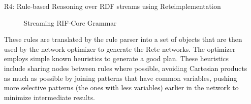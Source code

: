 \begin{nestedsection}{R4: Rule-based Reasoning over RDF streams using Rete}{implementation}
	\begin{figure}[t]
		\centering
		\begin{ebnf}
		\end{ebnf}
		\caption{Streaming RIF-Core Grammar}
	\end{figure}

	These rules are translated by the rule parser into a set of objects that are then used by the network optimizer to generate the Rete networks.
	The optimizer employs simple known heuristics to generate a good plan.
	These heuristics include sharing nodes between rules where possible, avoiding Cartesian products as much as possible by joining patterns that have common variables, pushing more selective patterns (the ones with less variables) earlier in the network to minimize intermediate results.
	

\end{nestedsection}
